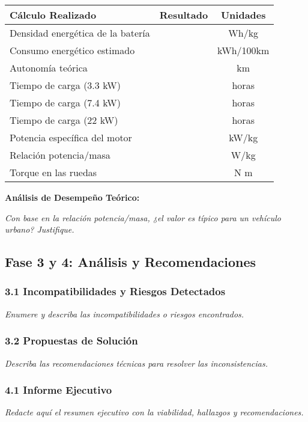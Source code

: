 \documentclass{article}
\begin{document}
\begin{tabular}{|l|c|c|}
\hline
\textbf{Cálculo Realizado} & \textbf{Resultado} & \textbf{Unidades} \\
\hline
Densidad energética de la batería & & Wh/kg \\
Consumo energético estimado & & kWh/100km \\
Autonomía teórica & & km \\
\hline
Tiempo de carga (3.3 kW) & & horas \\
Tiempo de carga (7.4 kW) & & horas \\
Tiempo de carga (22 kW) & & horas \\
\hline
Potencia específica del motor & & kW/kg \\
Relación potencia/masa & & W/kg \\
Torque en las ruedas & & N m \\
\hline
\end{tabular}

\vspace{5mm}

\textbf{Análisis de Desempeño Teórico:}\vspace{2mm}

\textit{Con base en la relación potencia/masa, ¿el valor es típico para un vehículo urbano? Justifique.}

\hrulefill

\subsection*{Fase 3 y 4: Análisis y Recomendaciones}

\subsubsection*{3.1 Incompatibilidades y Riesgos Detectados}
\textit{Enumere y describa las incompatibilidades o riesgos encontrados.}

\hrulefill

\subsubsection*{3.2 Propuestas de Solución}
\textit{Describa las recomendaciones técnicas para resolver las inconsistencias.}

\hrulefill

\subsubsection*{4.1 Informe Ejecutivo}
\textit{Redacte aquí el resumen ejecutivo con la viabilidad, hallazgos y recomendaciones.}
\end{document}
